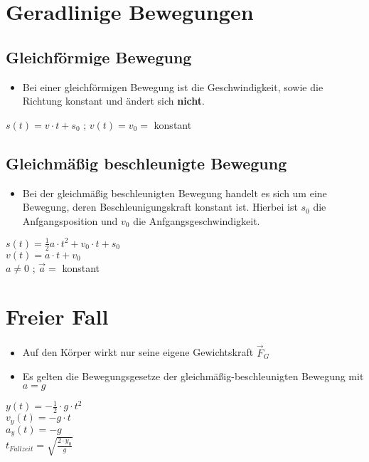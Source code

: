 \documentclass{article}
\begin{document}
\section*{Geradlinige Bewegungen}
\subsection*{Gleichförmige Bewegung}
\begin{itemize}
	\item Bei einer gleichförmigen Bewegung ist die Geschwindigkeit, sowie die Richtung konstant und ändert sich \textbf{nicht}.
\end{itemize}
\begin{center}
	$s(t) = v \cdot t + s_0$ ; $v(t) = v_0 =$ konstant
\end{center}
\subsection*{Gleichmäßig beschleunigte Bewegung}
\begin{itemize}
	\item Bei der gleichmäßig beschleunigten Bewegung handelt es sich um eine Bewegung, deren Beschleunigungskraft konstant ist. Hierbei ist $s_0$ die Anfgangsposition und $v_0$ die Anfgangsgeschwindigkeit.
\end{itemize}
\begin{center}
	$s(t) = \frac{1}{2}a \cdot t^2 + v_0 \cdot t + s_0$\\
	$v(t) = a \cdot t + v_0$\\
	$a \neq 0$ ; $\vec{a} =$ konstant
\end{center}
\section*{Freier Fall}
\begin{itemize}
	\item Auf den Körper wirkt nur seine eigene Gewichtskraft $\vec{F}_G$
	\item Es gelten die Bewegungsgesetze der gleichmäßig-beschleunigten Bewegung mit $a=g$
\end{itemize}
\begin{center}
	$y(t) = -\frac{1}{2} \cdot g \cdot t^2$\\
	$v_y(t) = -g \cdot t$\\
	$a_y(t) = -g$\\
	$t_{Fallzeit} = \sqrt{\frac{2 \cdot y_0}{g}}$
\end{center}
\end{document}
